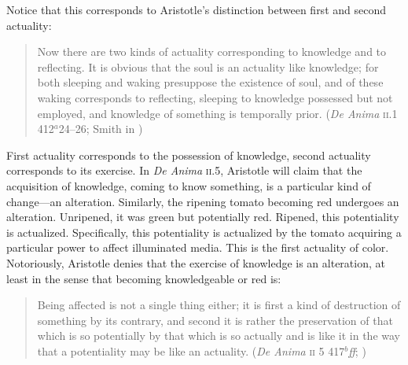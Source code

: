 Notice that this corresponds to Aristotle's distinction between first and second actuality:
\begin{quote}
	Now there are two kinds of actuality corresponding to knowledge and to reflecting. It is obvious that the soul is an actuality like knowledge; for both sleeping and waking presuppose the existence of soul, and of these waking corresponds to reflecting, sleeping to knowledge possessed but not employed, and knowledge of something is temporally prior. (\emph{De Anima} \textsc{ii}.1 412\( ^{a} \)24--26; Smith in \citealt[21]{Barnes:1984uq})
\end{quote}
First actuality corresponds to the possession of knowledge, second actuality corresponds to its exercise. In \emph{De Anima} \textsc{ii}.5, Aristotle will claim that the acquisition of knowledge, coming to know something, is a particular kind of change---an alteration. Similarly, the ripening tomato becoming red undergoes an alteration. Unripened, it was green but potentially red. Ripened, this potentiality is actualized. Specifically, this potentiality is actualized by the tomato acquiring a particular power to affect illuminated media. This is the first actuality of color. Notoriously, Aristotle denies that the exercise of knowledge is an alteration, at least in the sense that becoming knowledgeable or red is:
\begin{quote}
	 Being affected is not a single thing either; it is first a kind of destruction of something by its contrary, and second it is rather the preservation of that which is so potentially by that which is so actually and is like it in the way that a potentiality may be like an actuality. (\emph{De Anima} \textsc{ii} 5 417\( ^{b} \)\emph{ff}; \citealt[23--24]{Hamlyn:2002ys})
\end{quote}
